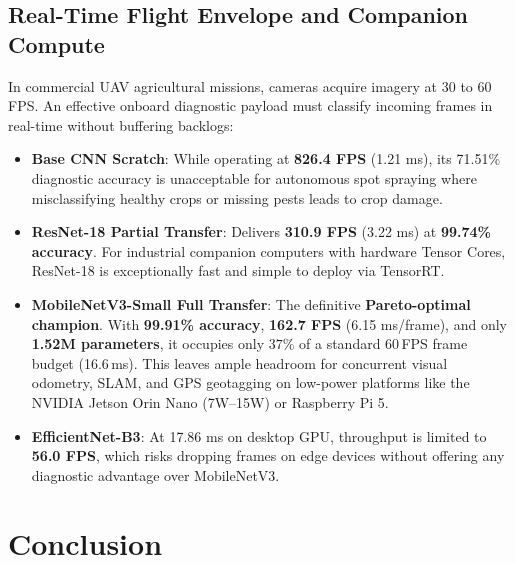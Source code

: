 \documentclass[11pt,a4paper]{article}
\begin{document}
\subsection{Real-Time Flight Envelope and Companion Compute}
In commercial UAV agricultural missions, cameras acquire imagery at 30 to 60 FPS. An effective onboard diagnostic payload must classify incoming frames in real-time without buffering backlogs:
\begin{itemize}
    \item \textbf{Base CNN Scratch}: While operating at \textbf{826.4 FPS} (1.21 ms), its 71.51\% diagnostic accuracy is unacceptable for autonomous spot spraying where misclassifying healthy crops or missing pests leads to crop damage.
    \item \textbf{ResNet-18 Partial Transfer}: Delivers \textbf{310.9 FPS} (3.22 ms) at \textbf{99.74\% accuracy}. For industrial companion computers with hardware Tensor Cores, ResNet-18 is exceptionally fast and simple to deploy via TensorRT.
    \item \textbf{MobileNetV3-Small Full Transfer}: The definitive \textbf{Pareto-optimal champion}. With \textbf{99.91\% accuracy}, \textbf{162.7 FPS} (6.15 ms/frame), and only \textbf{1.52M parameters}, it occupies only $37\%$ of a standard 60\,FPS frame budget (16.6\,ms). This leaves ample headroom for concurrent visual odometry, SLAM, and GPS geotagging on low-power platforms like the NVIDIA Jetson Orin Nano (7W--15W) or Raspberry Pi 5.
    \item \textbf{EfficientNet-B3}: At 17.86 ms on desktop GPU, throughput is limited to \textbf{56.0 FPS}, which risks dropping frames on edge devices without offering any diagnostic advantage over MobileNetV3.
\end{itemize}

\section{Conclusion}
\end{document}

